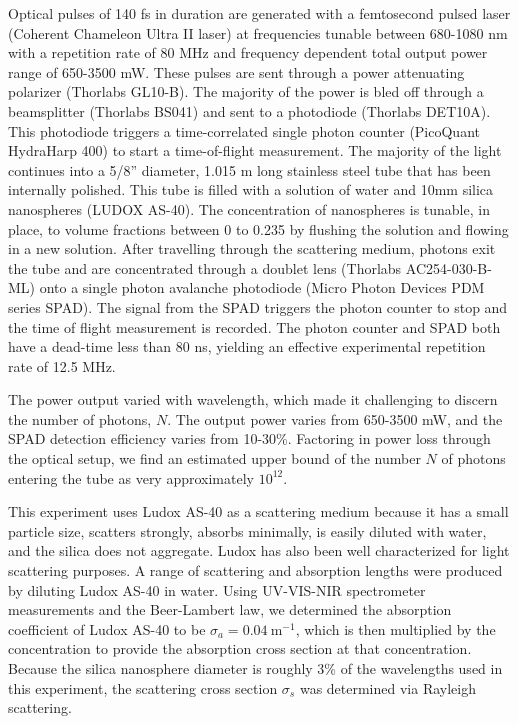 \documentclass[9pt,twocolumn,twoside]{opticajnl}
\begin{document}
Optical pulses of 140 fs in duration are generated with a femtosecond pulsed laser (Coherent Chameleon Ultra II laser) at frequencies tunable between 680-1080 nm with a repetition rate of 80 MHz and frequency dependent total output power range of 650-3500 mW. These pulses are sent through a power attenuating polarizer (Thorlabs GL10-B).  The majority of the power is bled off through a beamsplitter (Thorlabs BS041) and sent to a photodiode (Thorlabs DET10A).  This photodiode triggers a time-correlated single photon counter (PicoQuant HydraHarp 400) to start a time-of-flight measurement.  The majority of the light continues into a 5/8'' diameter, 1.015 m long stainless steel tube that has been internally polished.  This tube is filled with a solution of water and 10mm silica nanospheres (LUDOX AS-40).  The concentration of nanospheres is tunable, in place, to volume fractions between 0 to 0.235 by flushing the solution and flowing in a new solution.  After travelling through the scattering medium, photons exit the tube and are concentrated through a doublet lens (Thorlabs AC254-030-B-ML) onto a single photon avalanche photodiode (Micro Photon Devices PDM series SPAD).  The signal from the SPAD triggers the photon counter to stop and the time of flight measurement is recorded.  The photon counter and SPAD both have a dead-time less than 80 ns, yielding an effective experimental repetition rate of 12.5 MHz.

The power output varied with wavelength, which made it challenging to discern the number of photons, $N$. The output power varies from 650-3500 mW, and the SPAD detection efficiency varies from 10-30\%.  Factoring in power loss through the optical setup, we find an estimated upper bound of the number $N$ of photons entering the tube as very approximately $10^{12}$.

This experiment uses Ludox AS-40 as a scattering medium because it has a small particle size, scatters strongly, absorbs minimally, is easily diluted with water, and the silica does not aggregate. Ludox has also been well characterized for light scattering purposes\cite{dezelic_determination_1960,bonnelycke_light_1959,goring_light-scattering_1957}. A range of scattering and absorption lengths were produced by diluting Ludox AS-40 in water. Using UV-VIS-NIR spectrometer measurements and the Beer-Lambert law, we determined the absorption coefficient of Ludox AS-40 to be $\sigma_{a}=0.04\ \textrm{m}^{-1}$, which is then multiplied by the concentration to provide the absorption cross section at that concentration. Because the silica nanosphere diameter is roughly 3\% of the wavelengths used in this experiment, the scattering cross section $\sigma_{s}$ was determined via Rayleigh scattering. 
\end{document}
